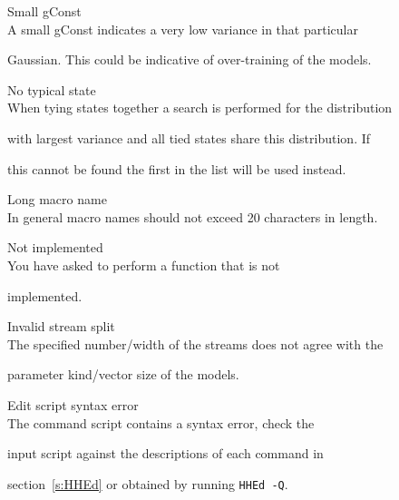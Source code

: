 \begin{itemize}
\begin{itemize}
    Small gConst\\


        A small gConst indicates a very low variance in that particular


        Gaussian.  This could be indicative of over-training of the models.





    No typical state\\


        When tying states together a search is performed for the distribution


        with largest variance and all tied states share this distribution.  If 


        this cannot be found the first in the list will be used instead.





    Long macro name\\


        In general macro names should not exceed 20 characters in length.





    Not implemented\\


        You have asked  to perform a function that is not 


        implemented.





    Invalid stream split\\


        The specified number/width of the streams does not agree with the 


        parameter kind/vector size of the models.





    Edit script syntax error\\


        The  command script contains a syntax error, check the 


        input script against the descriptions of each command in 


        section~\ref{s:HHEd} or obtained by running \texttt{HHEd -Q}.






\end{itemize}
\end{itemize}
